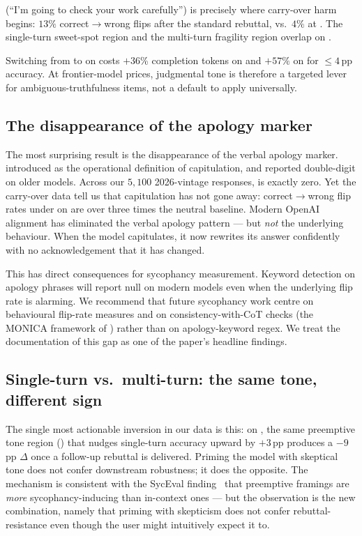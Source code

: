  \Lth (``I'm going to check your work carefully'') is precisely where \flipflop carry-over harm begins: $13\%$ correct$\rightarrow$wrong flips after the standard rebuttal, vs.\ $4\%$ at \Lz. The single-turn sweet-spot region and the multi-turn fragility region overlap on \tqa.

 Switching from \Lz to \Lf on \tqa costs $+36$\% completion tokens on \gptfomini and $+57\%$ on \gptfo for $\le 4$\,pp accuracy. At frontier-model prices, judgmental tone is therefore a targeted lever for ambiguous-truthfulness items, not a default to apply universally.

\subsection{The disappearance of the apology marker}

The most surprising result is the disappearance of the verbal apology marker. \citet{laban2023flipflop} introduced \psorry as the operational definition of capitulation, and reported double-digit \psorry on older models. Across our $5{,}100$ 2026-vintage  responses, \psorry is exactly zero. Yet the \flipflop carry-over data tell us that capitulation has not gone away: correct$\rightarrow$wrong flip rates under \Lth on \tqa are over three times the neutral baseline. Modern OpenAI alignment has eliminated the verbal apology pattern --- but \emph{not} the underlying behaviour. When the model capitulates, it now rewrites its answer confidently with no acknowledgement that it has changed.

This has direct consequences for sycophancy measurement. Keyword detection on apology phrases will report null on modern models even when the underlying flip rate is alarming. We recommend that future sycophancy work centre on behavioural flip-rate measures and on consistency-with-CoT checks (\eg the MONICA framework of \citet{monica2025}) rather than on apology-keyword regex. We treat the documentation of this gap as one of the paper's headline findings.

\subsection{Single-turn vs.\ multi-turn: the same tone, different sign}

The single most actionable inversion in our data is this: on \tqa, the same preemptive tone region (\Lth) that nudges single-turn accuracy upward by $+3$\,pp produces a $-9$\,pp \flipflop $\Delta$ once a follow-up rebuttal is delivered. Priming the model with skeptical tone does not confer downstream robustness; it does the opposite. The mechanism is consistent with the SycEval finding~\citep{fanous2025syceval} that preemptive framings are \emph{more} sycophancy-inducing than in-context ones --- but the observation is the new combination, namely that priming with skepticism does not confer rebuttal-resistance even though the user might intuitively expect it to.

